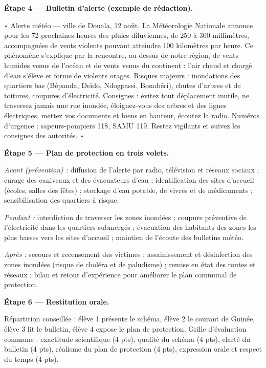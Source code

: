 \documentclass[11pt]{article}
\begin{document}
\begin{exoresolu}
\textbf{Étape 4 — Bulletin d'alerte (exemple de rédaction).}

« Alerte météo — ville de Douala, 12 août. La Météorologie Nationale annonce pour les 72 prochaines heures des pluies diluviennes, de 250 à 300 millimètres, accompagnées de vents violents pouvant atteindre 100 kilomètres par heure. Ce phénomène s'explique par la rencontre, au-dessus de notre région, de vents humides venus de l'océan et de vents venus du continent : l'air chaud et chargé d'eau s'élève et forme de violents orages. Risques majeurs : inondations des quartiers bas (Bépanda, Deïdo, Ndogpassi, Bonabéri), chutes d'arbres et de toitures, coupures d'électricité. Consignes : évitez tout déplacement inutile, ne traversez jamais une rue inondée, éloignez-vous des arbres et des lignes électriques, mettez vos documents et biens en hauteur, écoutez la radio. Numéros d'urgence : sapeurs-pompiers 118, SAMU 119. Restez vigilants et suivez les consignes des autorités. »

\textbf{Étape 5 — Plan de protection en trois volets.}

\emph{Avant (prévention) :} diffusion de l'alerte par radio, télévision et réseaux sociaux ; curage des caniveaux et des évacuateurs d'eau ; identification des sites d'accueil (écoles, salles des fêtes) ; stockage d'eau potable, de vivres et de médicaments ; sensibilisation des quartiers à risque.

\emph{Pendant :} interdiction de traverser les zones inondées ; coupure préventive de l'électricité dans les quartiers submergés ; évacuation des habitants des zones les plus basses vers les sites d'accueil ; maintien de l'écoute des bulletins météo.

\emph{Après :} secours et recensement des victimes ; assainissement et désinfection des zones inondées (risque de choléra et de paludisme) ; remise en état des routes et réseaux ; bilan et retour d'expérience pour améliorer le plan communal de protection.

\textbf{Étape 6 — Restitution orale.}

Répartition conseillée : élève 1 présente le schéma, élève 2 le courant de Guinée, élève 3 lit le bulletin, élève 4 expose le plan de protection. Grille d'évaluation commune : exactitude scientifique (4 pts), qualité du schéma (4 pts), clarté du bulletin (4 pts), réalisme du plan de protection (4 pts), expression orale et respect du temps (4 pts).
\end{exoresolu}
\end{document}
